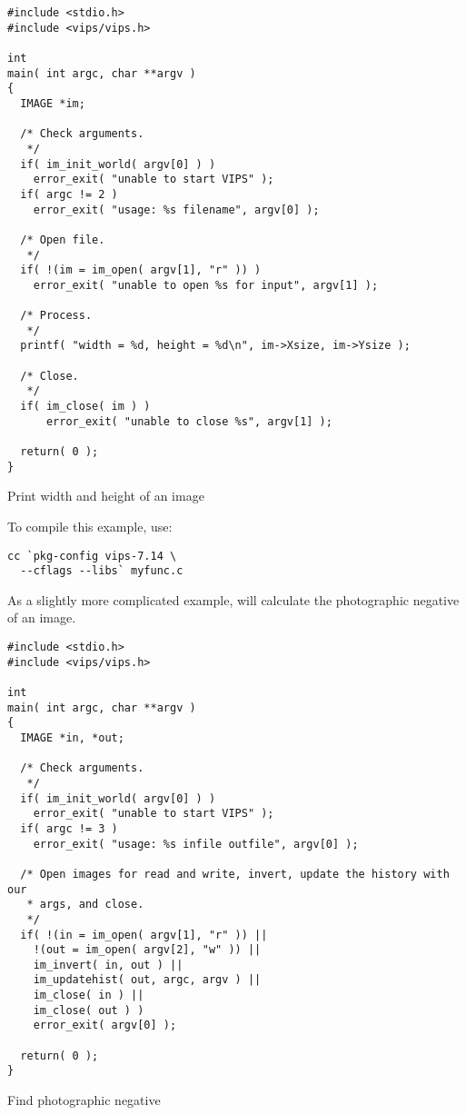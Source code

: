 \begin{fig2}
\begin{verbatim}
#include <stdio.h>
#include <vips/vips.h>

int
main( int argc, char **argv )
{
  IMAGE *im;

  /* Check arguments.
   */
  if( im_init_world( argv[0] ) )
    error_exit( "unable to start VIPS" );
  if( argc != 2 )
    error_exit( "usage: %s filename", argv[0] );

  /* Open file.
   */
  if( !(im = im_open( argv[1], "r" )) )
    error_exit( "unable to open %s for input", argv[1] );

  /* Process.
   */
  printf( "width = %d, height = %d\n", im->Xsize, im->Ysize );

  /* Close.
   */
  if( im_close( im ) )
      error_exit( "unable to close %s", argv[1] );

  return( 0 );
}
\end{verbatim}
\label{fg:widthheight}
\caption{Print width and height of an image}
\end{fig2}

To compile this example, use:

\begin{verbatim}
cc `pkg-config vips-7.14 \
  --cflags --libs` myfunc.c 
\end{verbatim}

As a slightly more complicated example, 
will calculate the photographic negative of an image.

\begin{fig2}
\begin{verbatim}
#include <stdio.h>
#include <vips/vips.h>

int
main( int argc, char **argv )
{
  IMAGE *in, *out;

  /* Check arguments.
   */
  if( im_init_world( argv[0] ) )
    error_exit( "unable to start VIPS" );
  if( argc != 3 )
    error_exit( "usage: %s infile outfile", argv[0] );

  /* Open images for read and write, invert, update the history with our
   * args, and close.
   */
  if( !(in = im_open( argv[1], "r" )) ||
    !(out = im_open( argv[2], "w" )) ||
    im_invert( in, out ) ||
    im_updatehist( out, argc, argv ) ||
    im_close( in ) || 
    im_close( out ) )
    error_exit( argv[0] );
  
  return( 0 );
}
\end{verbatim}
\label{fg:negative}
\caption{Find photographic negative}
\end{fig2}

